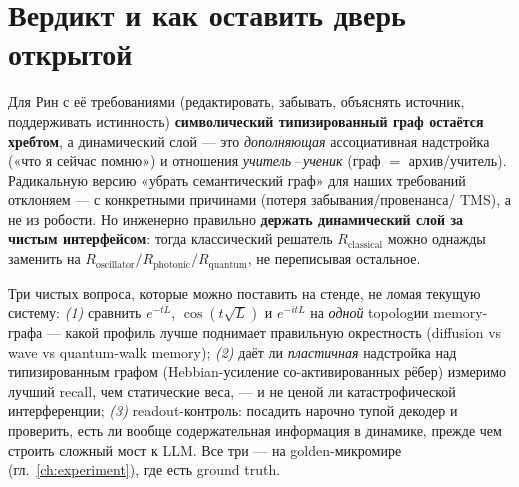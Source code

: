 \section{Вердикт и как оставить дверь открытой}

Для Рин с её требованиями (редактировать, забывать, объяснять источник, поддерживать
истинность) \textbf{символический типизированный граф остаётся хребтом}, а динамический слой —
это \emph{дополняющая} ассоциативная надстройка («что я сейчас помню») и отношения
\emph{учитель\,--\,ученик} (граф $=$ архив/учитель). Радикальную версию «убрать семантический
граф» для наших требований отклоняем — с конкретными причинами (потеря забывания/провенанса/
TMS), а не из робости. Но инженерно правильно \textbf{держать динамический слой за чистым
интерфейсом}: тогда классический решатель $R_{\text{classical}}$ можно однажды заменить на
$R_{\text{oscillator}}/R_{\text{photonic}}/R_{\text{quantum}}$, не переписывая остальное.

\begin{openq}
Три чистых вопроса, которые можно поставить на стенде, не ломая текущую систему:
\emph{(1)} сравнить $e^{-tL}$, $\cos(t\sqrt L)$ и $e^{-itL}$ на \emph{одной} topologии
memory-графа — какой профиль лучше поднимает правильную окрестность (diffusion vs wave vs
quantum-walk memory); \emph{(2)} даёт ли \emph{пластичная} надстройка над типизированным графом
(Hebbian-усиление со-активированных рёбер) измеримо лучший recall, чем статические веса, — и не
ценой ли катастрофической интерференции; \emph{(3)} readout-контроль: посадить нарочно тупой
декодер и проверить, есть ли вообще содержательная информация в динамике, прежде чем строить
сложный мост к LLM. Все три — на golden-микромире (гл.~\ref{ch:experiment}), где есть ground
truth.
\end{openq}
